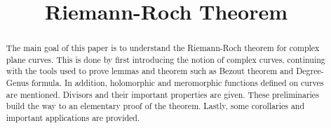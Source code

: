 \documentclass[12pt]{scrartcl}
\title{Riemann-Roch Theorem}
\begin{document}
\maketitle

\begin{abstract}
    The main goal of this paper is to understand the Riemann-Roch theorem for complex plane curves. This is done by first introducing the notion of complex curves, continuing with the tools used to prove lemmas and theorem such as Bezout theorem and Degree-Genus formula. In addition, holomorphic and meromorphic functions defined on curves are mentioned. Divisors and their important properties are given. These preliminaries build the way to an elementary proof of the theorem. Lastly, some corollaries and important applications are provided.
\end{abstract}

\newpage

\tableofcontents
\newpage









\newpage


\end{document}
